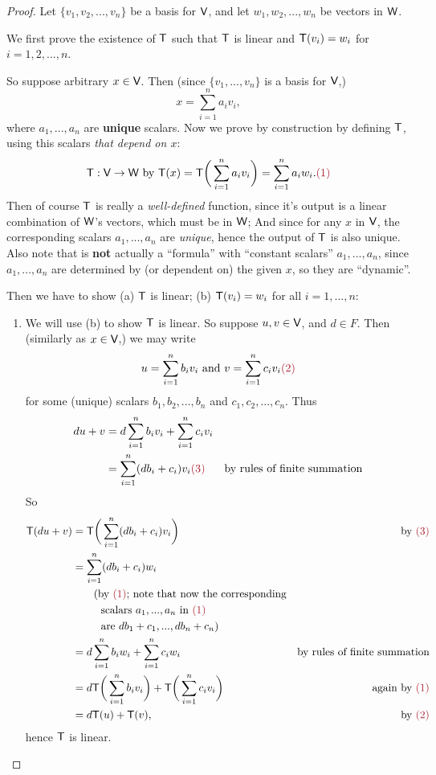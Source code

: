 \begin{proof}
Let \(\{ v_1, v_2, ..., v_n \}\) be a basis for \(\textsf{V}\), and let \(w_1, w_2, ..., w_n\) be vectors in \(\textsf{W}\).

We first prove the existence of \(\textsf{T}\) such that \(\textsf{T}\) is linear and \(\textsf{T}(v_i) = w_i\) for \(i = 1, 2, ..., n\).

So suppose arbitrary \(x \in \textsf{V}\).
Then (since \(\{ v_1, ..., v_n \}\) is a basis for \(\textsf{V}\),)
\[
    x = \sum_{i = 1}^n a_i v_i,
\]
where \(a_1, ..., a_n\) are \textbf{unique} scalars.
Now we prove by construction by defining \(\textsf{T}\), using this scalars \emph{that depend on \(x\)}:
\[
    \T : \V \to \W \text{ by } \T(x) = \T\bigg(\sum_{i = 1}^n a_i v_i\bigg) = \sum_{i = 1}^n a_i w_i. \MAROON{(1)}
\]
Then of course \(\textsf{T}\) is really a \emph{well-defined} function, since
 it's output is a linear combination of \(\textsf{W}\)'s vectors, which must be in \(\textsf{W}\);
 And since for any \(x\) in \(\textsf{V}\), the corresponding scalars \(a_1, ..., a_n\) are \emph{unique}, hence the output of \(\textsf{T}\) is also unique.
Also note that  is \textbf{not} actually a ``formula'' with ``constant scalars'' \(a_1, ..., a_n\), since \(a_1, ..., a_n\) are determined by (or dependent on) the given \(x\), so they are ``dynamic''.

Then we have to show (a) \(\textsf{T}\) is linear; (b) \(\textsf{T}(v_i) = w_i\) for all \(i = 1, ..., n\):
\begin{enumerate}
\item
We will use (b) to show \(\textsf{T}\) is linear.
So suppose \(u, v \in \textsf{V}\), and \(d \in F\).
Then (similarly as \(x \in \textsf{V}\),) we may write
\[
    u = \sum_{i = 1}^n b_i v_i \text{ and } v = \sum_{i = 1}^n c_i v_i \MAROON{(2)}
\]
for some (unique) scalars \(b_1, b_2, ..., b_n\) and \(c_1, c_2, ..., c_n\).
Thus
\begin{align*}
    d u + v & = d \sum_{i = 1}^n b_i v_i + \sum_{i = 1}^n c_i v_i \\
            & = \sum_{i = 1}^n (db_i + c_i) v_i \MAROON{(3)} & \text{by rules of finite summation}
\end{align*}
So
\begin{align*}
    \T(du + v) & = \T\bigg( \sum_{i = 1}^n (db_i + c_i) v_i \bigg) & \text{by \MAROON{(3)}} \\
               & = \sum_{i = 1}^n (db_i + c_i) w_i \\
               & \text{\ \ \ \ \ \ (by \MAROON{(1)}; note that now the corresponding} \\
               & \text{\ \ \ \ \ \ \ \ scalars \(a_1, ..., a_n\) in \MAROON{(1)}} \\
               & \text{\ \ \ \ \ \ \ \ are \(d b_1 + c_1, ..., d b_n + c_n\))} \\
               & = d \sum_{i = 1}^n b_i w_i + \sum_{i = 1}^n c_i w_i & \text{by rules of finite summation} \\
               & = d \T\bigg( \sum_{i = 1}^n b_i v_i \bigg) + \T\bigg( \sum_{i = 1}^n c_i v_i \bigg) & \text{again by \MAROON{(1)}} \\
               & = d \T(u) + \T(v), & \text{by \MAROON{(2)}}
\end{align*}
hence \(\textsf{T}\) is linear.


\end{enumerate}
\end{proof}
